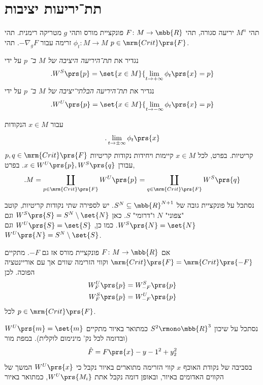 \documentclass[a4paper,10pt,twoside,openany]{book}
\begin{document}
\section{תת־יריעות יציבות}

\begin{definition}
תהי
$M^n$
יריעה סגורה, תהי
$F \colon M \to \mbb{R}$
פונקציית מורס ותהי
$g$
מטריקה רימנית.
תהי
$\phi_t \colon M \to M$
זרימה עבור
$- \nabla_g F$.
תהי
$p \in \mrm{Crit}\prs{F}$.

נגדיר את
\emph{תת־היריעה היציבה של
$M$
ב־%
$p$}
על ידי
\[\text{.} W^S\prs{p} = \set{x \in M}{\lim_{t \to +\infty} \phi_t\prs{x} = p}\]
נגדיר את
\emph{תת־היריעה הבלתי־יציבה של
$M$
ב־%
$p$}
על ידי
\[\text{.} W^U\prs{p} = \set{x \in M}{\lim_{t \to -\infty} \phi_t\prs{x} = p}\]
\end{definition}

\begin{remark}
עבור
$x \in M$
הנקודות
\[\text{.} \lim_{t \to \pm \infty} \phi_t\prs{x}\]
קריטיות.
בפרט, לכל
$x \in M$
קיימות ויחידות נקודות קריטיות
$p,q \in \mrm{Crit}\prs{F}$
עבורן
$x \in W^U\prs{p}, W^S\prs{q}$.
בפרט,
\begin{align*}
\text{.} M = \coprod_{p \in \mrm{Crit}\prs{F}} W^U\prs{p} = \coprod_{q \in \mrm{Crit}\prs{F}} W^S\prs{q}
\end{align*}
\end{remark}

\begin{example}
נסתכל על פונקציית גובה של
$S^N \subseteq \mbb{R}^{N+1}$.
יש לספירה שתי נקודות קריטיות, קוטב "צפוני"
$N$
ו"דרומי"
$S$.
כאן
$W^S\prs{S} = S^N \setminus \set{N}$
וגם
$W^S\prs{N} = \set{N}$.
כמו כן,
$W^U\prs{S} = \set{S}$
וגם
$W^U\prs{N} = S^N \setminus \set{S}$.
\end{example}

\begin{remark}
אם
$F \colon M \to \mbb{R}$
פונקציית מורס אז גם
$-F$.
מתקיים
$\mrm{Crit}\prs{F} = \mrm{Crit}\prs{-F}$
וקווי הזרימה שווים אך עם אוריינטציה הפוכה.
לכן
\begin{align*}
W_F^U\prs{p} &= W_{-F}^S\prs{p} \\
W_F^S\prs{p} &= W_{-F}^U\prs{p}
\end{align*}
לכל
$p \in \mrm{Crit}\prs{F}$.
\end{remark}

\begin{definition}
נסתכל על שיכון
$S^2 \rmono \mbb{R}^3$
כמתואר באיור
מתקיים
$W^U\prs{m} = \set{m}$
(ובדומה לכל נק' מינימום לוקלית).
במפת מור
\[\hat{F} = F\prs{x} - y-1^2 + y_2^2\]
 בסביבה של נקודת האוכף
$x$
קווי הזרימה מתוארים באיור
נקבל כי
$W^U\prs{x}$
המשך של הקווים האדומים באיור, ובאופן דומה נקבל אתת
$W^U\prs{M_i}$,
כמתואר באיור
\end{definition}
\end{document}
